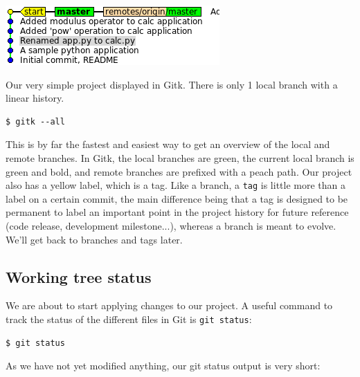 \documentclass[a4paper]{../../common/tufte-latex/tufte-handout}
\begin{document}
\begin{marginfigure}%
  \centering
  \includegraphics[width=\linewidth]{gitk-start.png}
  \label{fig:gitk-start}
  \caption{Our very simple project displayed in Gitk. There is only 1 local branch with a linear history.}
\end{marginfigure}

\begin{lstlisting}[style=BashInputStyle]
  $ gitk --all
\end{lstlisting}

This is by far the fastest and easiest way to get an overview of the local and remote branches.
In Gitk, the local branches are green, the current local branch is green and bold, and remote branches are prefixed with a peach path.
Our project also has a yellow label, which is a tag.
Like a branch, a \texttt{tag} is little more than a label on a certain commit, the main difference being that a tag is designed to be permanent to label an important point in the project history for future reference (code release, development milestone...), whereas a branch is meant to evolve.
We'll get back to branches and tags later.

\subsection{Working tree status}

We are about to start applying changes to our project.
A useful command to track the status of the different files in Git is \texttt{git status}:

\begin{lstlisting}[style=BashInputStyle]
  $ git status
\end{lstlisting}

As we have not yet modified anything, our git status output is very short:
\end{document}
